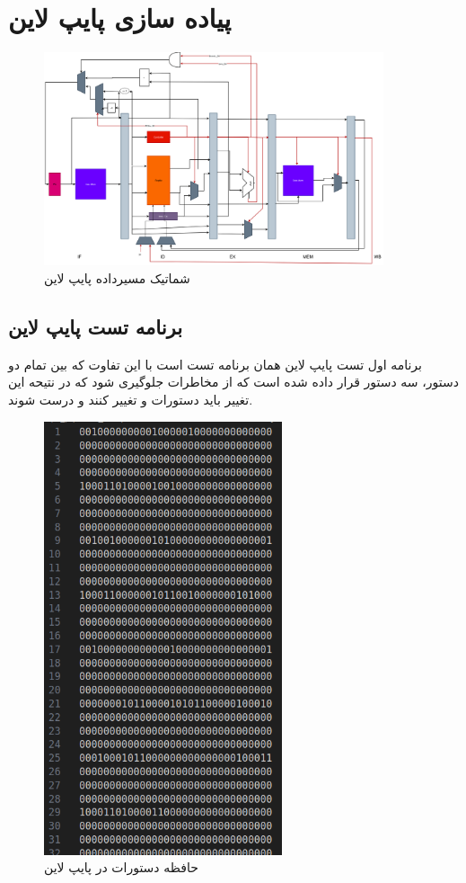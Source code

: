 \documentclass[11pt, a4paper]{article}
\begin{document}
	
	\section{پیاده سازی پایپ لاین}
	
	\begin{figure}[H]
		\begin{center}
			\includegraphics[width=10cm]{Photos/Pipeline_Figure.png}
		\end{center}
		\caption{شماتیک مسیرداده پایپ لاین}
		\label{Pipeline_schamitic}
	\end{figure}
 

	\subsection{برنامه تست پایپ لاین}
	برنامه اول تست پایپ لاین همان برنامه تست 
	است با این تفاوت که بین تمام دو دستور، سه دستور 
	قرار داده شده است که از مخاطرات جلوگیری شود که در نتیحه این تغییر باید دستورات 
	و
	تغییر کنند و درست شوند. 
	\begin{figure}[H]
		\begin{center}
			\includegraphics[width=7cm]{Photos/4.png}
		\end{center}
		\caption{حافظه دستورات در پایپ لاین}
		\label{Pipeline_inst_test}
	\end{figure}
	
\end{document}
